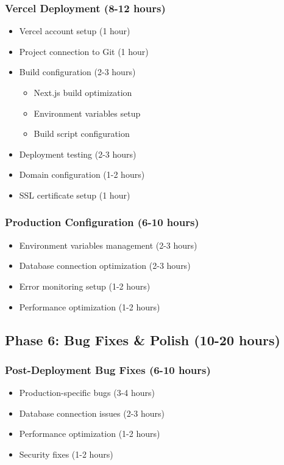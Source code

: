 \documentclass[11pt,a4paper]{article}
\begin{document}
\subsubsection{Vercel Deployment (8-12 hours)}
\begin{itemize}
    \item Vercel account setup (1 hour)
    \item Project connection to Git (1 hour)
    \item Build configuration (2-3 hours)
    \begin{itemize}
        \item Next.js build optimization
        \item Environment variables setup
        \item Build script configuration
    \end{itemize}
    \item Deployment testing (2-3 hours)
    \item Domain configuration (1-2 hours)
    \item SSL certificate setup (1 hour)
\end{itemize}

\subsubsection{Production Configuration (6-10 hours)}
\begin{itemize}
    \item Environment variables management (2-3 hours)
    \item Database connection optimization (2-3 hours)
    \item Error monitoring setup (1-2 hours)
    \item Performance optimization (1-2 hours)
\end{itemize}

\newpage

\subsection{Phase 6: Bug Fixes \& Polish (10-20 hours)}

\subsubsection{Post-Deployment Bug Fixes (6-10 hours)}
\begin{itemize}
    \item Production-specific bugs (3-4 hours)
    \item Database connection issues (2-3 hours)
    \item Performance optimization (1-2 hours)
    \item Security fixes (1-2 hours)
\end{itemize}
\end{document}
